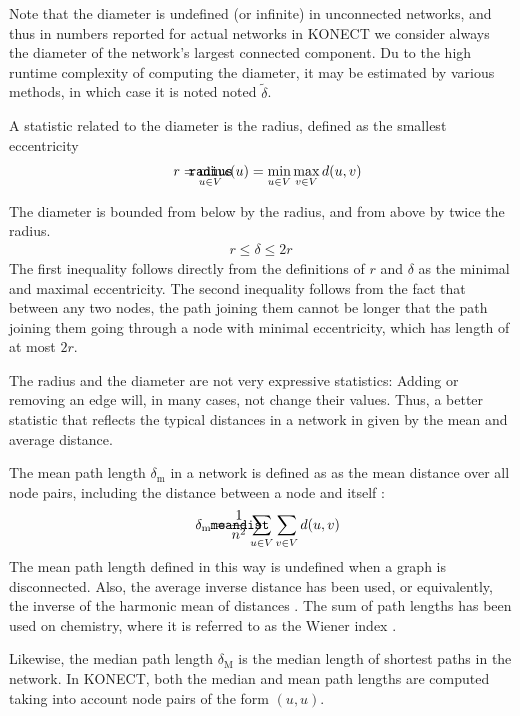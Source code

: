 \documentclass{article}
\def\mathnote#1{%
  \tag*{\rlap{\hspace\marginparsep\smash{\parbox[t]{\marginparwidth}{#1}}}}
}
\begin{document}
Note that the diameter is undefined (or infinite) in unconnected
networks, and thus in numbers reported for actual networks in KONECT we
consider always the diameter of the network's largest connected
component.  Du to the high runtime complexity of computing the diameter,
it may be estimated by various methods, in which case it is noted noted
$\tilde \delta$.

A statistic related to the diameter is the radius, defined as the
smallest eccentricity
\begin{align}
  \mathnote{\texttt{radius}} r &= \min_{u \in V} \epsilon(u) = \min_{u
    \in V} \max_{v \in V} d(u,v)
\end{align}

The diameter is bounded from below by the radius, and from above by
twice the radius.  
\begin{align*}
  r \leq \delta \leq 2r
\end{align*}
The first inequality follows directly from the definitions of $r$ and
$\delta$ as the minimal and maximal eccentricity.  The second inequality
follows from the fact that between any two nodes, the path joining them
cannot be longer that the path joining them going through a node with
minimal eccentricity, which has length of at most $2r$. 

The radius and the diameter are not very expressive statistics: Adding
or removing an edge will, in many cases, not change their values.  Thus,
a better statistic that reflects the typical distances in a network in
given by the mean and average distance.

The mean path length $\delta_{\mathrm m}$ in a network is defined as as
the mean distance over all node pairs, including the distance between a
node and itself \citep{b779}:
\begin{align}
  \mathnote{\texttt{meandist}} 
  \delta_{\mathrm m} &= \frac 1 {n^2}
  \sum_{u \in V} \sum_{v\in V} d(u,v)
\end{align}
The mean path length defined in this way is undefined when a graph is
disconnected.  Also, the average inverse distance has been used, or
equivalently, the inverse of the harmonic mean of distances
\citep{b877}.  The sum of path lengths has been used on chemistry, where
it is referred to as the Wiener index \citep{b901}.

Likewise, the median path length $\delta_{\mathrm M}$ is the median
length of shortest paths in the network.  In KONECT, both the median and
mean path lengths are computed taking into account node pairs of the
form $(u,u)$.
\end{document}
